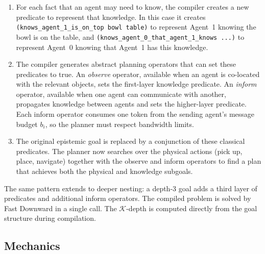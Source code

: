 \documentclass{article} %
\newcommand{\K}{\mathcal{K}}
\begin{document}
\begin{enumerate}
  \item For each fact that an agent may need to know, the compiler creates a new predicate to represent that knowledge. In this case it creates \texttt{(knows\_agent\_1\_is\_on\_top bowl table)} to represent Agent~1 knowing the bowl is on the table, and \texttt{(knows\_agent\_0\_that\_agent\_1\_knows ...)} to represent Agent~0 knowing that Agent~1 has this knowledge.
  \item The compiler generates abstract planning operators that can set these predicates to true. An \emph{observe} operator, available when an agent is co-located with the relevant objects, sets the first-layer knowledge predicate. An \emph{inform} operator, available when one agent can communicate with another, propagates knowledge between agents and sets the higher-layer predicate. Each inform operator consumes one token from the sending agent's message budget $b_i$, so the planner must respect bandwidth limits.
  \item The original epistemic goal is replaced by a conjunction of these classical predicates. The planner now searches over the physical actions (pick up, place, navigate) together with the observe and inform operators to find a plan that achieves both the physical and knowledge subgoals.
\end{enumerate}

The same pattern extends to deeper nesting: a depth-3 goal adds a third layer of predicates and additional inform operators. The compiled problem is solved by Fast Downward in a single call. The $\K$-depth is computed directly from the goal structure during compilation.




\subsection{Mechanics}
\label{sec:mechanics}
\end{document}
